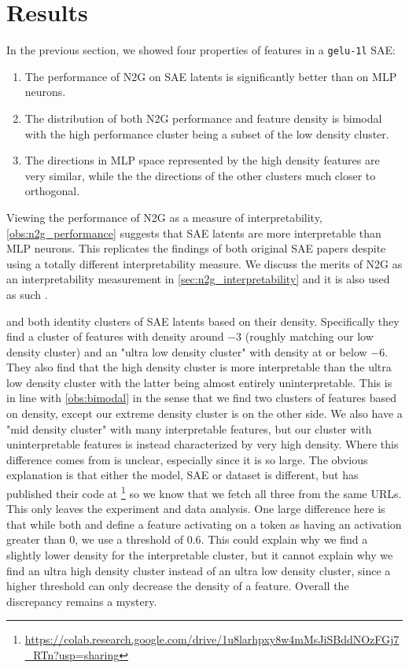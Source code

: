 \section{Results}
In the previous section, we showed four properties of features in a \texttt{gelu-1l} SAE: 
\begin{enumerate}[ref={observation~\arabic*}]
    \item The performance of N2G on SAE latents is significantly better than on MLP neurons.\label{obs:n2g_performance}
    \item The distribution of both N2G performance and feature density is bimodal with the high performance cluster being a subset of the low density cluster.\label{obs:bimodal}
    \item The directions in MLP space represented by the high density features are very similar, while the the directions of the other clusters much closer to orthogonal.\label{obs:directions}
\end{enumerate}
Viewing the performance of N2G as a measure of interpretability, \ref{obs:n2g_performance} suggests that SAE latents are more interpretable than MLP neurons.
This replicates the findings of both original SAE papers \parencite{bricken_towards_2023}\parencite{cunningham_sparse_2023} despite using a totally different interpretability measure.
We discuss the merits of N2G as an interpretability measurement in \autoref{sec:n2g_interpretability} and it is also used as such \textcite{gao_scaling_2024}.

\textcite{bricken_towards_2023} and \textcite{nanda_open_2023} both identity clusters of SAE latents based on their density.
Specifically they find a cluster of features with density around $-3$ (roughly matching our low density cluster) and an "ultra low density cluster" with density at or below $-6$.
They also find that the high density cluster is more interpretable than the ultra low density cluster with the latter being almost entirely uninterpretable.
This is in line with \ref{obs:bimodal} in the sense that we find two clusters of features based on density, except our extreme density cluster is on the other side.
We also have a "mid density cluster" with many interpretable features, but our cluster with uninterpretable features is instead characterized by very high density.
Where this difference comes from is unclear, especially since it is so large.
The obvious explanation is that either the model, SAE or dataset is different, but \textcite{nanda_open_2023} has published their code at \footnote{\url{https://colab.research.google.com/drive/1u8larhpxy8w4mMsJiSBddNOzFGj7_RTn?usp=sharing}} so we know that we fetch all three from the same URLs.
This only leaves the experiment and data analysis.
One large difference here is that while both \textcite{bricken_towards_2023} and \textcite{nanda_open_2023} define a feature activating on a token as having an activation greater than $0$, we use a threshold of $0.6$.
This could explain why we find a slightly lower density for the interpretable cluster, but it cannot explain why we find an ultra high density cluster instead of an ultra low density cluster, since a higher threshold can only decrease the density of a feature.
Overall the discrepancy remains a mystery.

